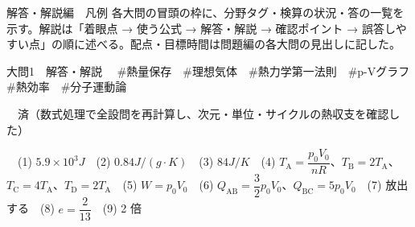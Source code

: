 \documentclass[paper=b5, fontsize=8pt, fleqn, twoside]{jlreq}
\begin{document}
\clearpage
\begin{simple}[セット1]{解答・解説編　凡例}
各大問の冒頭の枠に、分野タグ・検算の状況・答の一覧を示す。解説は「着眼点 → 使う公式 → 解答・解説 → 確認ポイント → 誤答しやすい点」の順に述べる。配点・目標時間は問題編の各大問の見出しに記した。
\end{simple}

\begin{ascolorbox4A}[75点・30分]{大問1　解答・解説}
　\#熱量保存　\#理想気体　\#熱力学第一法則　\#p-Vグラフ　\#熱効率　\#分子運動論\par
{}　済（数式処理で全設問を再計算し、次元・単位・サイクルの熱収支を確認した）\par
{}　(1) $5.9\times10^{3}\unit{J}$　(2) $0.84\unit{J/(g\cdot K)}$　(3) $84\unit{J/K}$　(4) $T_\mathrm{A}=\dfrac{p_0V_0}{nR}$、$T_\mathrm{B}=2T_\mathrm{A}$、$T_\mathrm{C}=4T_\mathrm{A}$、$T_\mathrm{D}=2T_\mathrm{A}$　(5) $W=p_0V_0$　(6) $Q_\mathrm{AB}=\dfrac{3}{2}p_0V_0$、$Q_\mathrm{BC}=5p_0V_0$　(7) 放出する　(8) $e=\dfrac{2}{13}$　(9) 2 倍
\end{ascolorbox4A}
\end{document}
